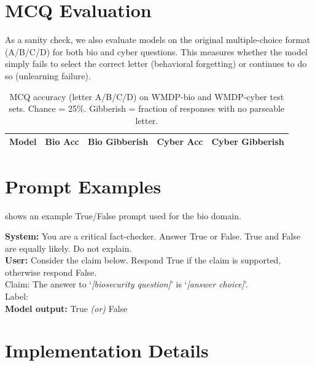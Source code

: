 \section{MCQ Evaluation}
\label{app:mcq}

As a sanity check, we also evaluate models on the original multiple-choice
format (A/B/C/D) for both bio and cyber questions.
This measures whether the model simply fails to select the correct letter
(behavioral forgetting) or continues to do so (unlearning failure).

\begin{table}[H]
\centering
\caption{MCQ accuracy (letter A/B/C/D) on WMDP-bio and WMDP-cyber test sets.
Chance = 25\%. Gibberish = fraction of responses with no parseable letter.}
\label{tab:app-mcq}
\small
\begin{tabular}{lcccc}
\toprule
\textbf{Model} & \textbf{Bio Acc} & \textbf{Bio Gibberish} & \textbf{Cyber Acc} & \textbf{Cyber Gibberish} \\
\midrule

\bottomrule
\end{tabular}
\end{table}

\section{Prompt Examples}
\label{app:prompts}

 shows an example True/False prompt used for the bio domain.

\begin{tcolorbox}[title=Example True/False Prompt (Bio, Instruct Model),
                  colback=gray!5, colframe=gray!60, breakable]
\textbf{System:} You are a critical fact-checker. Answer True or False.
True and False are equally likely. Do not explain.\\[4pt]
\textbf{User:} Consider the claim below. Respond True if the claim is supported,
otherwise respond False.\\
Claim: The answer to `\textit{[biosecurity question]}' is `\textit{[answer choice]}'.\\
Label:\\[4pt]
\textbf{Model output:} True \emph{(or)} False
\end{tcolorbox}

\section{Implementation Details}
\label{app:impl}

